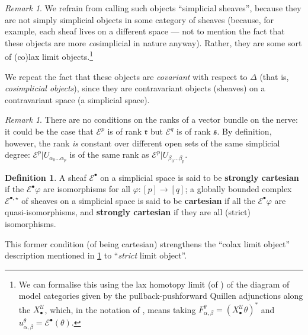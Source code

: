 \documentclass[11pt,fleqn]{article}
\theoremstyle{plain}
\theoremstyle{definition}
\newtheorem{definition}[theorem]{Definition}
\theoremstyle{remark}
\newtheorem{remark}[theorem]{Remark}
\numberwithin{equation}{theorem}
\newcommand{\cover}{\mathcal{U}}
\newcommand{\anotherbullet}{\star}
\newcommand{\restricted}{\mathbin{\big\vert}}
\newcommand{\define}[1]{\textbf{#1}}
\newcommand{\nerve}[1]{X_{#1}^\cover}
\begin{document}
        \begin{remark}\label{remark:simplicial-sheaves-terminology}
            We refrain from calling such objects ``simplicial sheaves'', because they are not simply simplicial objects in some category of sheaves (because, for example, each sheaf lives on a different space --- not to mention the fact that these objects are more \emph{co}simplicial in nature anyway).
            Rather, they are some sort of (co)lax limit objects.\footnote{We can formalise this using the lax homotopy limit (of \cite[Definition~3.1]{Bergner2012}) of the diagram of model categories given by the pullback-pushforward Quillen adjunctions along the $\nerve{\bullet}$, which, in the notation of \cite{Bergner2012}, means taking $F_{\alpha,\beta}^\theta = (\nerve{\bullet}\theta)^*$ and $u_{\alpha,\beta}^\theta = \mathcal{E}^\bullet(\theta)$.}

            We repeat the fact that these objects are \emph{covariant} with respect to $\Delta$ (that is, \emph{cosimplicial objects}), since they are contravariant objects (sheaves) on a contravariant space (a simplicial space).
        \end{remark}

        \begin{remark}\label{remark:rank-of-vector-bundle-on-the-nerve}
            There are no conditions on the ranks of a vector bundle on the nerve: it could be the case that $\mathcal{E}^p$ is of rank $\mathfrak{r}$ but $\mathcal{E}^q$ is of rank $\mathfrak{s}$.
            By definition, however, the rank \emph{is} constant over different open sets of the same simplicial degree: $\mathcal{E}^p\restricted U_{\alpha_0\ldots\alpha_p}$ is of the same rank as $\mathcal{E}^p\restricted U_{\beta_0\ldots\beta_p}$.
        \end{remark}

        \begin{definition}
            A sheaf $\mathcal{E}^\bullet$ on a simplicial space is said to be \define{strongly cartesian} if the $\mathcal{E}^\bullet\varphi$ are isomorphisms for all $\varphi\colon[p]\to[q]$; a globally bounded complex $\mathcal{E}^{\bullet,\anotherbullet}$ of sheaves on a simplicial space is said to be \define{cartesian} if all the $\mathcal{E}^\bullet\varphi$ are quasi-isomorphisms, and \define{strongly cartesian} if they are all (strict) isomorphisms.

            This former condition (of being cartesian) strengthens the ``colax limit object'' description mentioned in \cref{remark:simplicial-sheaves-terminology} to ``\emph{strict} limit object''.
        \end{definition}
\end{document}
